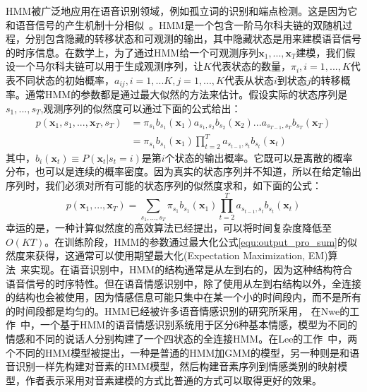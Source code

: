 HMM被广泛地应用在语音识别领域，例如孤立词的识别和端点检测。这是因为它和语音信号的产生机制十分相似~\cite{Rabiner2007An}。HMM是一个包含一阶马尔科夫链的双随机过程，分别包含隐藏的转移状态和可观测的输出，其中隐藏状态是用来建模语音信号的时序信息。在数学上，为了通过HMM给一个可观测序列$\mathbf{x}_1,...,\mathbf{x}_T$建模，我们假设一个马尔科夫链可以用于生成观测序列，让$K$代表状态的数量，$\pi_i, i=1,...,K$代表不同状态的初始概率，$a_{ij}, i=1,...K, j=1,...,K$代表从状态$i$到状态$j$的转移概率。通常HMM的参数都是通过最大似然的方法来估计。假设实际的状态序列是$s_1,...,s_T$,观测序列的似然度可以通过下面的公式给出：
\begin{equation}
\label{equ:output_pro}
    \begin{aligned}
        p(\mathbf{x}_1,s_1,...,\mathbf{x}_T,s_T) &= \pi_{s_1}b_{s_1}(\mathbf{x}_1)a_{s_1,s_2}b_{s_2}(\mathbf{x}_2)...a_{s_{T-1},s_T}b_{s_T}(\mathbf{x}_T) \\
        &= \pi_{s_1}b_{s_1}(\mathbf{x}_1)\prod\limits_{t=2}^Ta_{s_{t-1},s_t}b_{s_t}(\mathbf{x}_t)
    \end{aligned}
\end{equation}
其中，$b_i(\mathbf{x}_t) \equiv P(\mathbf{x}_t|s_t = i)$是第$i$个状态的输出概率。它既可以是离散的概率分布，也可以是连续的概率密度。因为真实的状态序列并不知道，所以在给定输出序列时，我们必须对所有可能的状态序列的似然度求和，如下面的公式：
\begin{equation}
\label{equ:output_pro_sum}
        p(\mathbf{x}_1,...,\mathbf{x}_T) = \sum\limits_{s_1,...,s_T}\pi_{s_1}b_{s_1}(\mathbf{x}_1)\prod\limits_{t=2}^Ta_{s_{t-1},s_t}b_{s_t}(\mathbf{x}_t)
\end{equation}
幸运的是，一种计算似然度的高效算法已经提出，可以将时间复杂度降低至$O(KT)$。在训练阶段，HMM的参数通过最大化公式\ref{equ:output_pro_sum}的似然度来获得，这通常可以使用期望最大化(Expectation Maximization, EM)算法~\cite{Dempster1977Maximum}来实现。在语音识别中，HMM的结构通常是从左到右的，因为这种结构符合语音信号的时序特性。但在语音情感识别中，除了使用从左到右结构以外，全连接的结构也会被使用，因为情感信息可能只集中在某一个小的时间段内，而不是所有的时间段都是均匀的。HMM已经被许多语音情感识别的研究所采用， 在Nwe的工作~\cite{Nogueiras2012Speech}中，一个基于HMM的语音情感识别系统用于区分6种基本情感，模型为不同的情感和不同的说话人分别构建了一个四状态的全连接HMM。在Lee的工作~\cite{Lee2004Emotion}中，两个不同的HMM模型被提出，一种是普通的HMM加GMM的模型，另一种则是和语音识别一样先构建对音素的HMM模型，然后构建音素序列到情感类别的映射模型，作者表示采用对音素建模的方式比普通的方式可以取得更好的效果。

